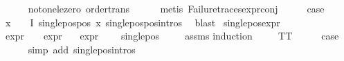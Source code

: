 \begin{isabellebody}
\ \ \ \ \isamarkupfalse%
\ not{\isacharunderscore}{\kern0pt}one{\isacharunderscore}{\kern0pt}le{\isacharunderscore}{\kern0pt}zero\ order{\isacharunderscore}{\kern0pt}trans\isanewline
\ \ \ \ \isamarkupfalse%
\ {\isacharparenleft}{\kern0pt}metis\ Failure{\isacharunderscore}{\kern0pt}traces{\isachardot}{\kern0pt}expr{\isacharunderscore}{\kern0pt}{}{\isacharunderscore}{\kern0pt}conj{\isacharparenright}{\kern0pt}\isanewline
\ \ \isamarkupfalse%
\ \isamarkupfalse%
\ {\isacharquery}{\kern0pt}case\ \isamarkupfalse%
\ {\isacartoucheopen}{\isasymforall}x\ {\isasymin}\ {\isasymPhi}\ {\isacharbackquote}{\kern0pt}\ I{\isachardot}{\kern0pt}\ single{\isacharunderscore}{\kern0pt}pos{\isacharunderscore}{\kern0pt}pos\ x{\isacartoucheclose}\ single{\isacharunderscore}{\kern0pt}pos{\isacharunderscore}{\kern0pt}pos{\isachardot}{\kern0pt}intros{\isacharparenleft}{\kern0pt}{}{\isacharparenright}{\kern0pt}\ \isamarkupfalse%
\ blast\isanewline
{}\isamarkupfalse%
%
\endisatagproof
{\isafoldproof}%
%
\isadelimproof
\isanewline
%
\endisadelimproof
\isanewline
{}\isamarkupfalse%
\ single{\isacharunderscore}{\kern0pt}pos{\isacharunderscore}{\kern0pt}expr{\isacharcolon}{\kern0pt}\isanewline
{}\ {\isachardoublequoteopen}expr{\isacharunderscore}{\kern0pt}{}\ {\isasymphi}\ {\isasymle}\ {}{\isachardoublequoteclose}\ {\isachardoublequoteopen}expr{\isacharunderscore}{\kern0pt}{}\ {\isasymphi}\ {\isasymle}\ {}{\isachardoublequoteclose}\isanewline
{\isachardoublequoteopen}expr{\isacharunderscore}{\kern0pt}{}\ {\isasymphi}\ {\isasymle}\ {}{\isachardoublequoteclose}\isanewline
{}\ {\isachardoublequoteopen}single{\isacharunderscore}{\kern0pt}pos\ {\isasymphi}{\isachardoublequoteclose}\isanewline
%
\isadelimproof
\ \ %
\endisadelimproof
%
\isatagproof
{}\isamarkupfalse%
\ assms\isanewline
{}\isamarkupfalse%
{\isacharparenleft}{\kern0pt}induction\ {\isasymphi}{\isacharparenright}{\kern0pt}\isanewline
\ \ \isamarkupfalse%
\ TT\isanewline
\ \ \isamarkupfalse%
\ \isamarkupfalse%
\ {\isacharquery}{\kern0pt}case\ \isanewline
\ \ \ \ \isamarkupfalse%
\ {\isacharparenleft}{\kern0pt}simp\ add{\isacharcolon}{\kern0pt}\ single{\isacharunderscore}{\kern0pt}pos{\isachardot}{\kern0pt}intros{\isacharparenleft}{\kern0pt}{}{\isacharparenright}{\kern0pt}{\isacharparenright}{\kern0pt}\isanewline

\end{isabellebody}
